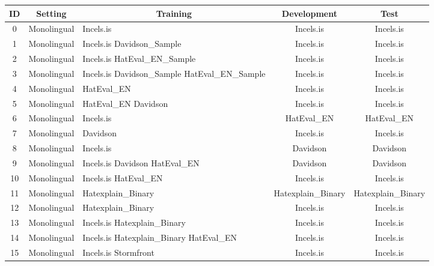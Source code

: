 \begin{tabular}{|c|c|p{3cm}|c|c|}
\hline
\textbf{ID} & \textbf{Setting} & \multicolumn{1}{c|}{\textbf{Training}} & \textbf{Development} & \textbf{Test} \\ \hline
0 & Monolingual & Incels.is & Incels.is & Incels.is \\ \hline
1 & Monolingual & Incels.is \newline Davidson\_Sample & Incels.is & Incels.is \\ \hline
2 & Monolingual & Incels.is \newline HatEval\_EN\_Sample & Incels.is & Incels.is \\ \hline
3 & Monolingual & Incels.is \newline Davidson\_Sample \newline HatEval\_EN\_Sample & Incels.is & Incels.is \\ \hline
4 & Monolingual & HatEval\_EN & Incels.is & Incels.is \\ \hline
5 & Monolingual & HatEval\_EN \newline Davidson & Incels.is & Incels.is \\ \hline
6 & Monolingual & Incels.is & HatEval\_EN & HatEval\_EN \\ \hline
7 & Monolingual & Davidson & Incels.is & Incels.is \\ \hline
8 & Monolingual & Incels.is & Davidson & Davidson \\ \hline
9 & Monolingual & Incels.is \newline Davidson \newline HatEval\_EN & Davidson & Davidson \\ \hline
10 & Monolingual & Incels.is \newline HatEval\_EN & Incels.is & Incels.is \\ \hline
11 & Monolingual & Hatexplain\_Binary & Hatexplain\_Binary & Hatexplain\_Binary \\ \hline
12 & Monolingual & Hatexplain\_Binary & Incels.is & Incels.is \\ \hline
13 & Monolingual & Incels.is \newline Hatexplain\_Binary & Incels.is & Incels.is \\ \hline
14 & Monolingual & Incels.is \newline Hatexplain\_Binary \newline HatEval\_EN & Incels.is & Incels.is \\ \hline
15 & Monolingual & Incels.is \newline Stormfront & Incels.is & Incels.is \\ \hline

\end{tabular}
